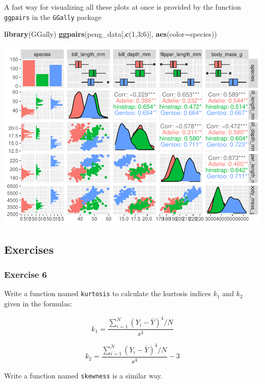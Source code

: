 \documentclass[
]{article}
\newenvironment{Shaded}{\begin{snugshade}}{\end{snugshade}}
\newcommand{\AttributeTok}[1]{\textcolor[rgb]{0.13,0.29,0.53}{#1}}
\newcommand{\DecValTok}[1]{\textcolor[rgb]{0.00,0.00,0.81}{#1}}
\newcommand{\FunctionTok}[1]{\textcolor[rgb]{0.13,0.29,0.53}{\textbf{#1}}}
\newcommand{\NormalTok}[1]{#1}
\newcommand{\SpecialCharTok}[1]{\textcolor[rgb]{0.81,0.36,0.00}{\textbf{#1}}}
\begin{document}
A fast way for visualizing all these plots at once is provided by the
function \texttt{ggpairs} in the \texttt{GGally} package

\begin{Shaded}
\begin{Highlighting}[]
\FunctionTok{library}\NormalTok{(GGally)}
\FunctionTok{ggpairs}\NormalTok{(peng\_data[,}\FunctionTok{c}\NormalTok{(}\DecValTok{1}\NormalTok{,}\DecValTok{3}\SpecialCharTok{:}\DecValTok{6}\NormalTok{)], }\FunctionTok{aes}\NormalTok{(}\AttributeTok{color=}\NormalTok{species))}
\end{Highlighting}
\end{Shaded}

\includegraphics{EDA_files/figure-latex/unnamed-chunk-37-1.pdf}

\hypertarget{exercises}{%
\subsection{Exercises}\label{exercises}}

\hypertarget{exercise-6}{%
\subsubsection{Exercise 6}\label{exercise-6}}

Write a function named \texttt{kurtosis} to calculate the kurtosis
indices \(k_1\) and \(k_2\) given in the formulas:

\[
k_1 = \frac{\sum_{i=1}^N (Y_i - \bar{Y})^4 / N}{s^4}
\]

\[
k_2 = \frac{\sum_{i=1}^N (Y_i - \bar{Y})^4 / N}{s^4} - 3
\]

Write a function named \texttt{skewness} is a similar way.
\end{document}
